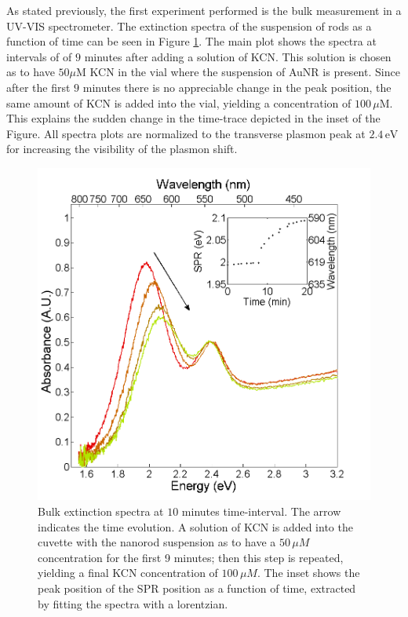 \documentclass[twocolumn]{article}
\begin{document}
As stated previously, the first experiment performed is the bulk measurement in
a UV-VIS spectrometer. The extinction spectra of the suspension of rods as a
function of time can be seen in Figure \ref{fig:bulk}. The main plot shows the
spectra at intervals of of $9$ minutes after adding a solution of KCN. This
solution is chosen as to have $50\mu\textrm{M}$ KCN in the vial where the
suspension of AuNR is present. Since after the first $9$ minutes there is no appreciable
change in the peak position, the same amount of KCN is added into the vial,
yielding a concentration of $100\,\mu\textrm{M}$. This explains the sudden
change in the time-trace depicted in the inset of the Figure. All spectra plots are
normalized to the transverse plasmon peak at $2.4\,\textrm{eV}$ for increasing
the visibility of the plasmon shift.

\begin{figure}[tp]
 \centering 
 \includegraphics[width=0.95\linewidth]{plasmon_bulk.png}
 \caption{Bulk extinction spectra at $10$ minutes time-interval. The arrow
 indicates the time evolution. A solution of KCN is added into the cuvette with
 the nanorod suspension as to have a $50\,\mu M$ concentration for the first 9
 minutes; then this step is repeated, yielding a final KCN concentration of
 $100\, \mu M$. The inset shows the peak position of the SPR position as a
 function of time, extracted by fitting the spectra with a lorentzian.  }
 \label{fig:bulk}
\end{figure}
\end{document}
